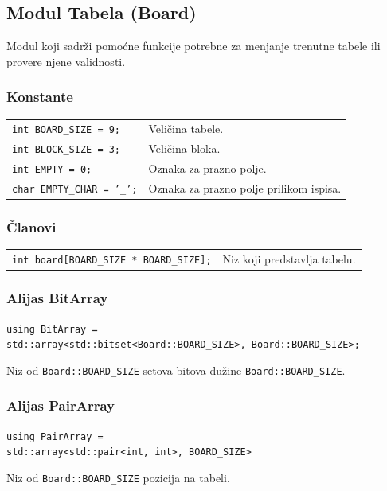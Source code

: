\documentclass[a4paper]{article}
\begin{document}
    \subsection{Modul Tabela (Board)}
    Modul koji sadrži pomoćne funkcije potrebne za menjanje trenutne tabele ili provere njene validnosti.
    \subsubsection{Konstante}
    \begin{tabular}{ l l }
        \par\texttt{int BOARD\_SIZE = 9;} & Veličina tabele. \\
        \par\texttt{int BLOCK\_SIZE = 3;} & Veličina bloka. \\
        \par\texttt{int EMPTY = 0;}  & Oznaka za prazno polje. \\
        \par\texttt{char EMPTY\_CHAR = '\_';}  & Oznaka za prazno polje prilikom ispisa.
    \end{tabular}
    
    \subsubsection{Članovi}
    \begin{tabular}{ l l }
        \par\texttt{int board[BOARD\_SIZE * BOARD\_SIZE];} & Niz koji predstavlja tabelu.\\
    \end{tabular}

    \subsubsection{Alijas BitArray}
    \texttt{using BitArray = }\\
    \texttt{std::array<std::bitset<Board::BOARD\_SIZE>, Board::BOARD\_SIZE>;}
    \par Niz od \texttt{Board::BOARD\_SIZE} setova bitova dužine \texttt{Board::BOARD\_SIZE}.

    \subsubsection{Alijas PairArray}
    \texttt{using PairArray = }\\ 
    \texttt{std::array<std::pair<int, int>, BOARD\_SIZE>}
    \par Niz od \texttt{Board::BOARD\_SIZE} pozicija na tabeli.
\end{document}
